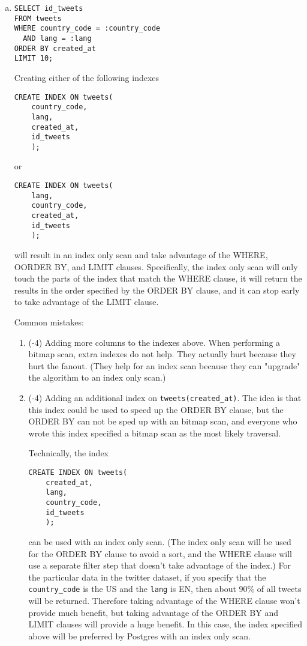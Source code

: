 \documentclass[12pt]{exam}
\theoremstyle{definition}
\begin{document}
\begin{questions}
{\begin{enumerate}[a.]
    \item
\begin{lstlisting}
SELECT id_tweets
FROM tweets
WHERE country_code = :country_code
  AND lang = :lang
ORDER BY created_at
LIMIT 10;
\end{lstlisting}
\begin{solution}
Creating either of the following indexes
\begin{lstlisting}
CREATE INDEX ON tweets(
    country_code,
    lang,
    created_at,
    id_tweets
    );
\end{lstlisting}
or
\begin{lstlisting}
CREATE INDEX ON tweets(
    lang,
    country_code,
    created_at,
    id_tweets
    );
\end{lstlisting}
will result in an index only scan and take advantage of the WHERE, OORDER BY, and LIMIT clauses.
Specifically, the index only scan will only touch the parts of the index that match the WHERE clause,
it will return the results in the order specified by the ORDER BY clause,
and it can stop early to take advantage of the LIMIT clause.

Common mistakes:
    \begin{enumerate}
        \item (-4)
            Adding more columns to the indexes above.
            When performing a bitmap scan,
            extra indexes do not help.
            They actually hurt because they hurt the fanout.
            (They help for an index scan because they can "upgrade" the algorithm to an index only scan.)
        \item (-4)
            Adding an additional index on \lstinline{tweets(created_at)}.
            The idea is that this index could be used to speed up the ORDER BY clause,
            but the ORDER BY can not be sped up with an bitmap scan,
            and everyone who wrote this index specified a bitmap scan as the most likely traversal.

            Technically, the index
            \begin{lstlisting}
CREATE INDEX ON tweets(
    created_at,
    lang,
    country_code,
    id_tweets
    );
            \end{lstlisting}
            can be used with an index only scan.
            (The index only scan will be used for the ORDER BY clause to avoid a sort, and the WHERE clause will use a separate filter step that doesn't take advantage of the index.)
            For the particular data in the twitter dataset, if you specify that the \lstinline{country_code} is the US and the \lstinline{lang} is EN,
            then about 90\% of all tweets will be returned.
            Therefore taking advantage of the WHERE clause won't provide much benefit,
            but taking advantage of the ORDER BY and LIMIT clauses will provide a huge benefit.
            In this case, the index specified above will be preferred by Postgres with an index only scan.
    \end{enumerate}
\end{solution}


\end{enumerate}}
\end{questions}
\end{document}
